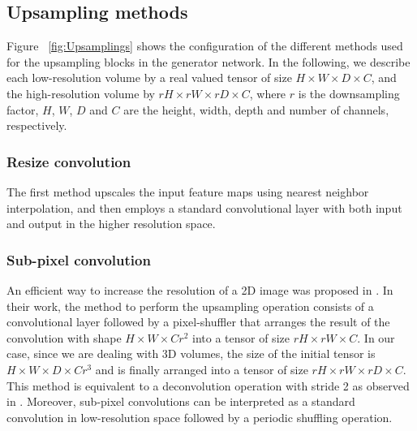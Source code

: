 \documentclass{article}
\begin{document}
\subsection{Upsampling methods}
\label{ssec:upsampling} 
Figure ~\ref{fig:Upsamplings} shows the configuration of the different methods used for the upsampling blocks in the generator network. In the following, we describe each low-resolution volume by a real valued tensor of size $H \times W \times D \times C$, and the high-resolution volume by $rH \times rW \times rD \times C$, where $r$ is the downsampling factor, $H$, $W$, $D$ and $C$ are the height, width, depth and number of channels, respectively.

\subsubsection{Resize convolution}
\label{sssec:nn}
The first method upscales the input feature maps using nearest neighbor interpolation, and then employs a standard convolutional layer with both input and output in the higher resolution space.



\subsubsection{Sub-pixel convolution}
\label{sssec:subpixel}
An efficient way to increase the resolution of a 2D image was proposed in \cite{shi:efficsubpixel}. In their work, the method to perform the upsampling operation consists of a convolutional layer followed by a pixel-shuffler that arranges the result of the convolution with shape $ H \times W \times Cr^{2} $ into a tensor of size $ rH \times rW \times C $. In our case, since we are dealing with 3D volumes, the size of the initial tensor is $ H \times W \times D \times Cr^{3} $ and is finally arranged into a tensor of size $ rH \times rW \times rD \times C $. This method is equivalent to a deconvolution operation with stride 2 as observed in \cite{shi:deconvsubpix}. Moreover, sub-pixel convolutions can be interpreted as a standard convolution in low-resolution space followed by a periodic shuffling operation.
\end{document}
